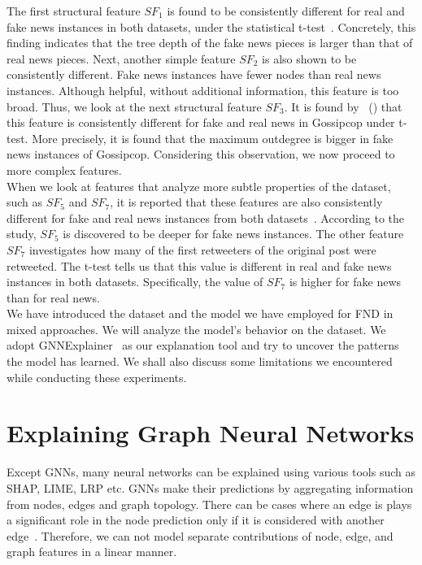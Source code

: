The first structural feature $SF_1$ is found to be consistently different for real and fake news instances in both datasets, under the statistical t-test~\parencite{HierarchicalPropagationNetworksForFND_Shu}. Concretely, this finding indicates that the tree depth of the fake news pieces is larger than that of real news pieces. Next, another simple feature $SF_2$ is also shown to be consistently different. Fake news instances have fewer nodes than real news instances. Although helpful, without additional information, this feature is too broad. Thus, we look at the next structural feature $SF_3$. It is found by~\citeauthor{HierarchicalPropagationNetworksForFND_Shu} (\citeyear{HierarchicalPropagationNetworksForFND_Shu}) that this feature is consistently different for fake and real news in Gossipcop under t-test. More precisely, it is found that the maximum outdegree is bigger in fake news instances of Gossipcop. Considering this observation, we now proceed to more complex features.\\
When we look at features that analyze more subtle properties of the dataset, such as $SF_5$ and $SF_7$, it is reported that these features are also consistently different for fake and real news instances from both datasets~\parencite{HierarchicalPropagationNetworksForFND_Shu}. According to the study, $SF_5$ is discovered to be deeper for fake news instances. The other feature $SF_7$ investigates how many of the first retweeters of the original post were retweeted. The t-test tells us that this value is different in real and fake news instances in both datasets. Specifically, the value of $SF_7$ is higher for fake news than for real news.\\
We have introduced the dataset and the model we have employed for FND in mixed approaches. We will analyze the model's behavior on the dataset. We adopt GNNExplainer~\parencite{GNNExplainer_Ying} as our explanation tool and try to uncover the patterns the model has learned. We shall also discuss some limitations we encountered while conducting these experiments.

\section{Explaining Graph Neural Networks}
\label{sec:ExplainingGNNs}
Except GNNs, many neural networks can be explained using various tools such as SHAP, LIME, LRP etc. GNNs
make their predictions by aggregating information from nodes, edges and graph topology. There can be cases where an edge
is plays a significant role in the node prediction only if it is considered with another edge~\parencite{CNNsOnGraphsForLearningMolecularFingerprints_Duvenaud}. Therefore, we can not model separate contributions of node,
edge, and graph features in a linear manner.\\

